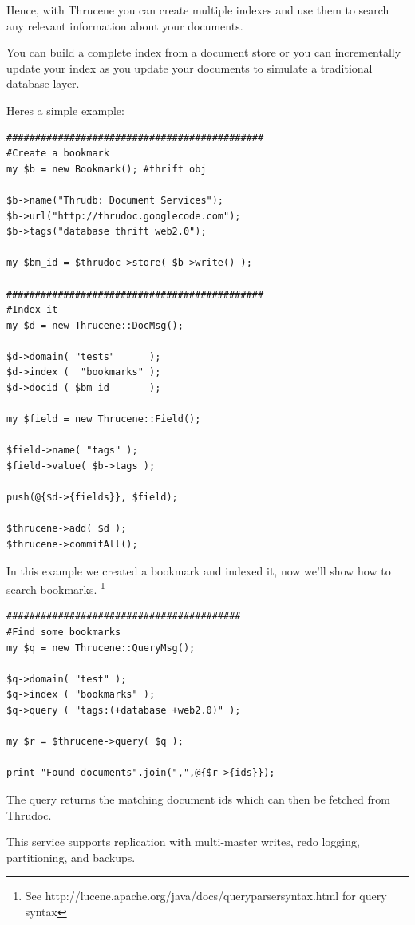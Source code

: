 \documentclass[nocopyrightspace,blockstyle]{sigplanconf}
\begin{document}
Hence, with Thrucene you can create multiple indexes and use them to search any relevant information about your documents.

You can build a complete index from a document store or you can incrementally update your
index as you update your documents to simulate a traditional database layer.

Heres a simple example:

\begin{verbatim}
#############################################
#Create a bookmark
my $b = new Bookmark(); #thrift obj

$b->name("Thrudb: Document Services");
$b->url("http://thrudoc.googlecode.com");
$b->tags("database thrift web2.0");

my $bm_id = $thrudoc->store( $b->write() );

#############################################
#Index it
my $d = new Thrucene::DocMsg();

$d->domain( "tests"      );
$d->index (  "bookmarks" );
$d->docid ( $bm_id       );

my $field = new Thrucene::Field();

$field->name( "tags" );
$field->value( $b->tags );

push(@{$d->{fields}}, $field);

$thrucene->add( $d );
$thrucene->commitAll();

\end{verbatim}

In this example we created a bookmark and indexed it, now we'll show how to search bookmarks.
\footnote{See http://lucene.apache.org/java/docs/queryparsersyntax.html for query syntax}

\begin{verbatim}
#########################################
#Find some bookmarks
my $q = new Thrucene::QueryMsg();

$q->domain( "test" );
$q->index ( "bookmarks" );
$q->query ( "tags:(+database +web2.0)" );

my $r = $thrucene->query( $q );

print "Found documents".join(",",@{$r->{ids}});

\end{verbatim}

The query returns the matching document ids which can then be
fetched from Thrudoc.

This service supports replication with multi-master writes, redo logging, partitioning, and backups.
\end{document}
